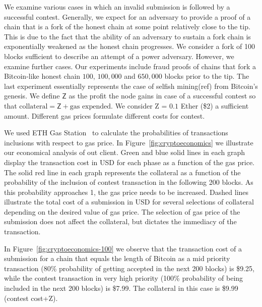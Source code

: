 We examine various cases in which an invalid submission is followed by a
successful contest. Generally, we expect for an adversary to provide a proof of
a chain that is a fork of the honest chain at some point relatively close to
the tip. This is due to the fact that the ability of an adversary to sustain a
fork chain is exponentially weakened as the honest chain progresses. We
consider a fork of 100 blocks sufficient to describe an attempt of a power
adversary. However, we examine further cases. Our experiments include fraud
proofs of chains that fork a Bitcoin-like honest chain $100$, $100{,}000$ and
$650{,}000$ blocks prior to the tip. The last experiment essentially represents
the case of selfish mining(ref) from Bitcoin's genesis. We define $\textsf{Z}$
as the profit the node gains in case of a successful contest so that $
\text{collateral} = \textsf{Z} + \text{gas expended}$. We consider \textsf{Z} =
$0.1$ Ether (\$2) a sufficient amount. Different gas prices formulate different
costs for contest.

We used ETH Gas Station~\cite{eth-gas-station} to calculate the probabilities
of transactions inclusions with respect to gas price. In
Figure~\ref{fig:cryptoeconomics} we illustrate our economical analysis of out
client. Green and blue solid lines in each graph display the transaction cost
in USD for each phase as a function of the gas price. The solid red line in
each graph represents the collateral as a function of the probability of the
inclusion of contest transaction in the following 200 blocks. As this
probability approaches 1, the gas price needs to be increased. Dashed lines
illustrate the total cost of a submission in USD for several selections of
collateral depending on the desired value of gas price.  The selection of gas
price of the submission does not affect the collateral, but dictates the
immediacy of the transaction.

In Figure~\ref{fig:cryptoeconomics-100} we observe that the transaction cost of
a submission for a chain that equals the length of Bitcoin as a mid priority
transaction (80\% probability of getting accepted in the next 200 blocks) is
\$9.25, while the contest transaction in very high priority (100\% probability
of being included in the next 200 blocks) is \$7.99. The collateral in this
case is \$9.99 (contest cost+\textsf{Z}).

